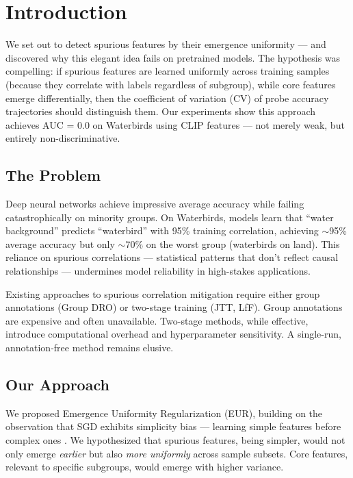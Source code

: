 \section{Introduction}

We set out to detect spurious features by their emergence uniformity --- and discovered why this elegant idea fails on pretrained models. The hypothesis was compelling: if spurious features are learned uniformly across training samples (because they correlate with labels regardless of subgroup), while core features emerge differentially, then the coefficient of variation (CV) of probe accuracy trajectories should distinguish them. Our experiments show this approach achieves AUC = 0.0 on Waterbirds using CLIP features --- not merely weak, but entirely non-discriminative.

\subsection{The Problem}

Deep neural networks achieve impressive average accuracy while failing catastrophically on minority groups. On Waterbirds, models learn that ``water background'' predicts ``waterbird'' with 95\% training correlation, achieving $\sim$95\% average accuracy but only $\sim$70\% on the worst group (waterbirds on land). This reliance on spurious correlations --- statistical patterns that don't reflect causal relationships --- undermines model reliability in high-stakes applications.

Existing approaches to spurious correlation mitigation require either group annotations (Group DRO) or two-stage training (JTT, LfF). Group annotations are expensive and often unavailable. Two-stage methods, while effective, introduce computational overhead and hyperparameter sensitivity. A single-run, annotation-free method remains elusive.

\subsection{Our Approach}

We proposed Emergence Uniformity Regularization (EUR), building on the observation that SGD exhibits simplicity bias --- learning simple features before complex ones \citep{shah2020pitfalls}. We hypothesized that spurious features, being simpler, would not only emerge \emph{earlier} but also \emph{more uniformly} across sample subsets. Core features, relevant to specific subgroups, would emerge with higher variance.

